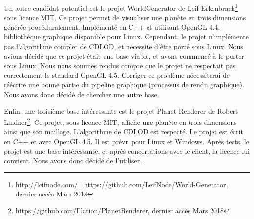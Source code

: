 Un autre candidat potentiel est le projet WorldGenerator de Leif
Erkenbrach\footnote{\url{http://leifnode.com/} |
\url{https://github.com/LeifNode/World-Generator}, dernier accès Mars 2018} sous licence MIT. Ce
projet permet de visualiser une planète en trois dimensions générée
procéduralement. Implémenté en C++ et utilisant OpenGL 4.4, bibliothèque
graphique disponible pour Linux. Cependant, le projet n'implémente pas
l'algorithme complet de CDLOD, et nécessite d'être porté sous Linux.
Nous avions décidé que ce projet était une base viable, et avons
commencé à le porter sous Linux. Nous nous sommes rendus compte que le
projet ne respectait pas correctement le standard OpenGL 4.5. Corriger
ce problème nécessiterai de réécrire une bonne partie du pipeline
graphique (processus de rendu graphique). Nous avons donc décidé de
chercher une autre base.

Enfin, une troisième base intéressante est le projet Planet Renderer de
Robert
Lindner\footnote{\url{https://github.com/Illation/PlanetRenderer}, dernier accès Mars 2018}. Ce
projet, sous licence MIT, affiche une planète en trois dimensions ainsi
que son maillage. L'algorithme de CDLOD est respecté. Le projet est
écrit en C++ et avec OpenGL 4.5. Il est prévu pour Linux et Windows.
Après tests, le projet est une base intéressante, et après concertations
avec le client, la licence lui convient. Nous avons donc décidé de
l'utiliser.
